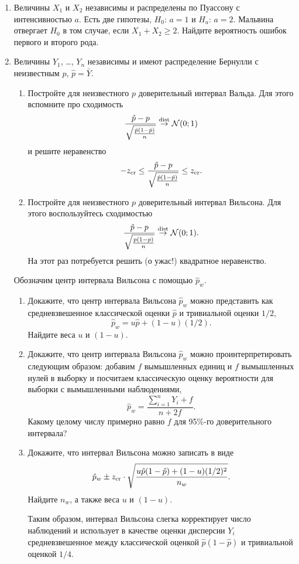\begin{enumerate}[resume]
\item Величины $X_1$ и $X_2$ независимы и распределены по Пуассону с  интенсивностью $a$. 
Есть две гипотезы, $H_0$: $a=1$ и $H_a$: $a=2$. Мальвина отвергает $H_0$ в том случае, если $X_1 + X_2 \geq 2$. 
Найдите вероятность ошибок первого и второго рода.

\item Величины $Y_1$, \ldots, $Y_n$ независимы и имеют распределение Бернулли с неизвестным $p$,
$\hat p = \bar Y$. 

\begin{enumerate}
  \item Постройте для неизвестного $p$ доверительный интервал Вальда.
  Для этого вспомните про сходимость 
  \[
  \frac{\hat p - p}{\sqrt{\frac{\hat p (1 - \hat p)}{n}}} \overset{\text{dist}}{\to} \mathcal{N}(0;1)
  \]
  и решите неравенство 
  \[
    -z_{\text{cr}} \leq \frac{\hat p - p}{\sqrt{\frac{\hat p (1 - \hat p)}{n}}} \leq z_{\text{cr}}.
  \]

  \item Постройте для неизвестного $p$ доверительный интервал Вильсона.
  Для этого воспользуйтесь сходимостью
  \[
  \frac{\hat p - p}{\sqrt{\frac{p (1 - p)}{n}}} \overset{\text{dist}}{\to} \mathcal{N}(0;1).
  \]
  На этот раз потребуется решить (о ужас!) квадратное неравенство. 
\end{enumerate}
Обозначим центр интервала Вильсона с помощью $\hat p_w$.
\begin{enumerate}[resume]
  \item Докажите, что центр интервала Вильсона $\hat p_w$ можно представить как 
  средневзвешенное классической оценки $\hat p$ и тривиальной оценки $1/2$,
  \[
  \hat p_w = u \hat p + (1 - u) (1/2).  
  \]
  Найдите веса $u$ и $(1-u)$.
  \item Докажите, что центр интервала Вильсона $\hat p_w$ можно
  проинтерпретировать следующим образом: добавим $f$ вымышленных единиц и $f$ вымышленных нулей 
  в выборку и посчитаем классическую оценку вероятности для выборки с вымышленными наблюдениями,
  \[
  \hat p_w = \frac{\sum_{i=1}^n Y_i + f}{n + 2 f}.
  \]
  Какому целому числу примерно равно $f$ для 95\%-го доверительного интервала?
  \item Докажите, что интервал Вильсона можно записать в виде
  \[
    \hat p_w \pm z_{\text{cr}} \cdot \sqrt{\frac{u \hat p (1 - \hat p) + (1 - u) (1/2)^2 }{n_w}}.
  \]
  Найдите $n_w$, а также веса $u$ и $(1 - u)$.

  Таким образом, интервал Вильсона слегка корректирует число наблюдений
  и использует в качестве оценки дисперсии $Y_i$ средневзвешенное между классической оценкой $\hat p (1 - \hat p)$
  и тривиальной оценкой $1/4$.


\end{enumerate}
\end{enumerate}
